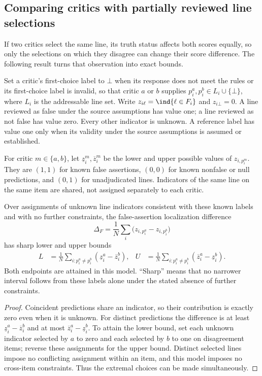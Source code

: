 \subsection{Comparing critics with partially reviewed line selections}
\label{app:sharp-comparison}
If two critics select the same line, its truth status affects both scores equally, so only the selections on which they disagree can change their score difference. The following result turns that observation into exact bounds.

Set a critic's first-choice label to $\bot$ when its response does not meet the rules or its first-choice label is invalid, so that critic $a$ or $b$ supplies $p_i^a,p_i^b\in L_i\cup\{\bot\}$, where $L_i$ is the addressable line set. Write $z_{i\ell}=\ind\{\ell\in F_i\}$ and $z_{i\bot}=0$. A line reviewed as false under the source assumptions has value one; a line reviewed as not false has value zero. Every other indicator is unknown. A reference label has value one only when its validity under the source assumptions is assumed or established.

For critic $m\in\{a,b\}$, let $\underline z_i^m,\overline z_i^m$ be the lower and upper possible values of $z_{i,p_i^m}$. They are $(1,1)$ for known false assertions, $(0,0)$ for known nonfalse or null predictions, and $(0,1)$ for unadjudicated lines. Indicators of the same line on the same item are shared, not assigned separately to each critic.

\begin{proposition}
\label{prop:sharp-comparison}
Over assignments of unknown line indicators consistent with these known labels and with no further constraints, the false-assertion localization difference
\[
\Delta_F=\frac1N\sum_i\bigl(z_{i,p_i^a}-z_{i,p_i^b}\bigr)
\]
has sharp lower and upper bounds
\begin{align}
L&=\frac1N\sum_{i:p_i^a\ne p_i^b}(\underline z_i^a-\overline z_i^b),&
U&=\frac1N\sum_{i:p_i^a\ne p_i^b}(\overline z_i^a-\underline z_i^b).
\label{eq:sharp-comparison}
\end{align}
Both endpoints are attained in this model. ``Sharp'' means that no narrower interval follows from these labels alone under the stated absence of further constraints.
\end{proposition}
\begin{proof}
Coincident predictions share an indicator, so their contribution is exactly zero even when it is unknown. For distinct predictions the difference is at least $\underline z_i^a-\overline z_i^b$ and at most $\overline z_i^a-\underline z_i^b$. To attain the lower bound, set each unknown indicator selected by $a$ to zero and each selected by $b$ to one on disagreement items; reverse these assignments for the upper bound. Distinct selected lines impose no conflicting assignment within an item, and this model imposes no cross-item constraints. Thus the extremal choices can be made simultaneously.
\end{proof}

